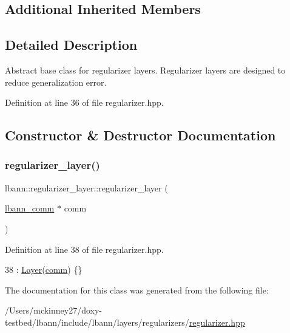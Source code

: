 \subsection*{Additional Inherited Members}


\subsection{Detailed Description}
Abstract base class for regularizer layers. Regularizer layers are designed to reduce generalization error. 

Definition at line 36 of file regularizer.\+hpp.



\subsection{Constructor \& Destructor Documentation}
\mbox{\label{classlbann_1_1regularizer__layer_a2ebf3877b905b479a0250b74cf8f68b3}} 
\subsubsection{\texorpdfstring{regularizer\+\_\+layer()}{regularizer\_layer()}}
{\footnotesize\ttfamily lbann\+::regularizer\+\_\+layer\+::regularizer\+\_\+layer (\begin{DoxyParamCaption}\item[{\hyperlink{classlbann_1_1lbann__comm}{lbann\+\_\+comm} $\ast$}]{comm }\end{DoxyParamCaption})\hspace{0.3cm}{\ttfamily [inline]}}



Definition at line 38 of file regularizer.\+hpp.


\begin{DoxyCode}
38 : \hyperlink{classlbann_1_1Layer_a24e9c82354a0a2af1b70cbca2211e7d4}{Layer}(\hyperlink{file__io_8cpp_ab048c6f9fcbcfaa57ce68b00263dbebe}{comm}) \{\}
\end{DoxyCode}


The documentation for this class was generated from the following file\+:\begin{DoxyCompactItemize}
\item 
/\+Users/mckinney27/doxy-\/testbed/lbann/include/lbann/layers/regularizers/\hyperlink{regularizer_8hpp}{regularizer.\+hpp}\end{DoxyCompactItemize}
